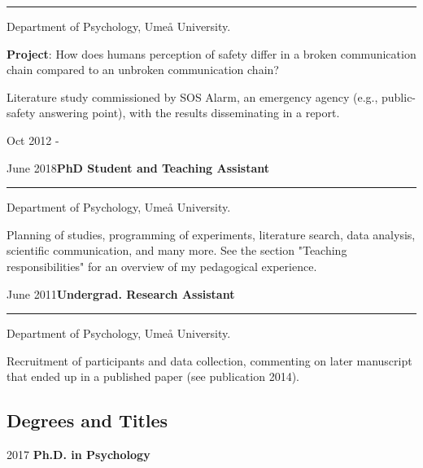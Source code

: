 \documentclass[]{article}
\begin{document}
\hrule
\begin{changemargin}{2.3cm}{2.4cm}

Department of Psychology, Umeå University.

\textbf{Project}: How does humans perception of safety differ in a broken communication chain compared to an unbroken communication chain? 

Literature study commissioned by SOS Alarm, an emergency agency (e.g., public-safety answering point), with the results disseminating in a report.

\end{changemargin}

Oct 2012 -

June
2018\hspace{0.75cm}\textbf{PhD Student and Teaching Assistant}\vspace{1mm}

\hrule
\begin{changemargin}{2.3cm}{2.4cm}

Department of Psychology, Umeå University.

Planning of studies, programming of experiments, literature search, data analysis, scientific communication, and many more. See the section "Teaching responsibilities" for an overview of my pedagogical experience.

\end{changemargin}

June
2011\hspace{0.75cm}\textbf{Undergrad. Research Assistant}\vspace{1mm}

\hrule
\begin{changemargin}{2.3cm}{2.4cm}

Department of Psychology, Umeå University.

Recruitment of participants and data collection, commenting on later manuscript that ended up in a published paper (see publication 2014). 

\end{changemargin}

\newpage

\hypertarget{degrees-and-titles}{%
\subsection{Degrees and Titles}\label{degrees-and-titles}}

2017 \hspace{1.5cm} \textbf{Ph.D. in Psychology}\vspace{1mm}
\end{document}
